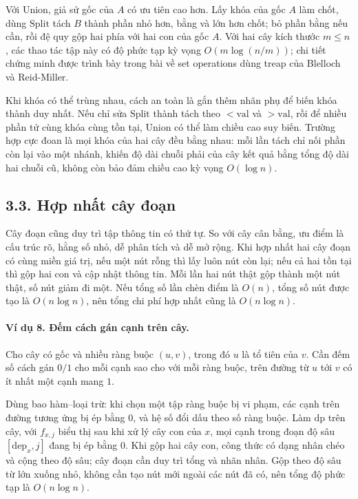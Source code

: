 \documentclass[11pt]{article}
\begin{document}
Với \(\mathrm{Union}\), giả sử gốc của \(A\) có ưu tiên cao hơn. Lấy khóa của
gốc \(A\) làm chốt, dùng \(\mathrm{Split}\) tách \(B\) thành phần nhỏ hơn, bằng
và lớn hơn chốt; bỏ phần bằng nếu cần, rồi đệ quy gộp hai phía với hai con của
gốc \(A\). Với hai cây kích thước \(m\le n\), các thao tác tập này có độ phức
tạp kỳ vọng \(O(m\log(n/m))\); chi tiết chứng minh được trình bày trong bài về
set operations dùng treap của Blelloch và Reid-Miller.

Khi khóa có thể trùng nhau, cách an toàn là gắn thêm nhãn phụ để biến khóa
thành duy nhất. Nếu chỉ sửa \(\mathrm{Split}\) thành tách theo \(<\mathrm{val}\)
và \(>\mathrm{val}\), rồi để nhiều phần tử cùng khóa cùng tồn tại, \(\mathrm{Union}\)
có thể làm chiều cao suy biến. Trường hợp cực đoan là mọi khóa của hai cây đều
bằng nhau: mỗi lần tách chỉ nối phần còn lại vào một nhánh, khiến độ dài chuỗi
phải của cây kết quả bằng tổng độ dài hai chuỗi cũ, không còn bảo đảm chiều cao
kỳ vọng \(O(\log n)\).


\subsection*{3.3. Hợp nhất cây đoạn}

Cây đoạn cũng duy trì tập thông tin có thứ tự. So với cây cân bằng, ưu điểm là
cấu trúc rõ, hằng số nhỏ, dễ phân tích và dễ mở rộng. Khi hợp nhất hai cây đoạn
có cùng miền giá trị, nếu một nút rỗng thì lấy luôn nút còn lại; nếu cả hai tồn
tại thì gộp hai con và cập nhật thông tin. Mỗi lần hai nút thật gộp thành một
nút thật, số nút giảm đi một. Nếu tổng số lần chèn điểm là \(O(n)\), tổng số
nút được tạo là \(O(n\log n)\), nên tổng chi phí hợp nhất cũng là
\(O(n\log n)\).

\paragraph{Ví dụ 8. Đếm cách gán cạnh trên cây.}
Cho cây có gốc và nhiều ràng buộc \((u,v)\), trong đó \(u\) là tổ tiên của
\(v\). Cần đếm số cách gán \(0/1\) cho mỗi cạnh sao cho với mỗi ràng buộc, trên
đường từ \(u\) tới \(v\) có ít nhất một cạnh mang \(1\).

Dùng bao hàm--loại trừ: khi chọn một tập ràng buộc bị vi phạm, các cạnh trên
đường tương ứng bị ép bằng \(0\), và hệ số đổi dấu theo số ràng buộc. Làm
\(\mathrm{dp}\) trên cây, với \(f_{x,j}\) biểu thị sau khi xử lý cây con của
\(x\), mọi cạnh trong đoạn độ sâu \([\mathrm{dep}_x,j]\) đang bị ép bằng \(0\).
Khi gộp hai cây con, công thức có dạng nhân chéo và cộng theo độ sâu; cây đoạn
cần duy trì tổng và nhãn nhân. Gộp theo độ sâu từ lớn xuống nhỏ, không cần tạo
nút mới ngoài các nút đã có, nên tổng độ phức tạp là \(O(n\log n)\).
\end{document}
